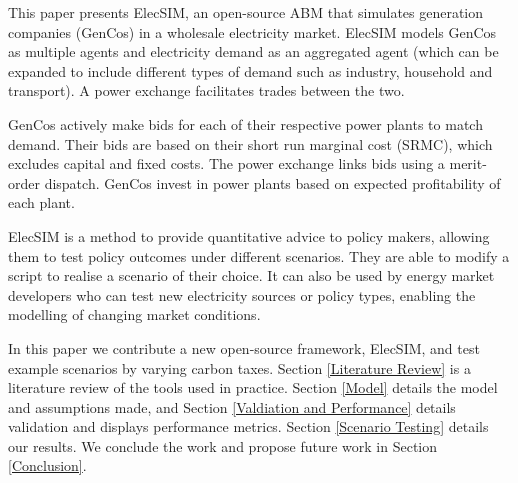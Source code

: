This paper presents ElecSIM, an open-source ABM that simulates generation companies (GenCos) in a wholesale electricity market. ElecSIM models GenCos as multiple agents and electricity demand as an aggregated agent (which can be expanded to include different types of demand such as industry, household and transport). A power exchange facilitates trades between the two. 

GenCos actively make bids for each of their respective power plants to match demand. Their bids are based on their short run marginal cost (SRMC), which excludes capital and fixed costs. The power exchange links bids  using a merit-order dispatch. GenCos invest in power plants based on expected profitability of each plant.	

ElecSIM is a method to provide quantitative advice to policy makers, allowing them to test policy outcomes under different scenarios. They are able to modify a script to realise a scenario of their choice. It can also be used by energy market developers who can test new electricity sources or policy types, enabling the modelling of changing market conditions.







In this paper we contribute a new open-source framework, ElecSIM, and test example scenarios by varying carbon taxes. Section \ref{Literature Review} is a literature review of the tools used in practice. Section \ref{Model} details the model and assumptions made, and Section \ref{Valdiation and Performance} details validation and displays performance metrics. Section \ref{Scenario Testing} details our results. We conclude the work and propose future work in Section \ref{Conclusion}.


